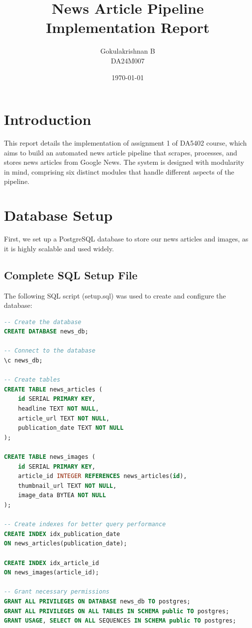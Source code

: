 \documentclass{article}
\title{News Article Pipeline Implementation Report}
\author{Gokulakrishnan B \\ DA24M007}
\date{\today}
\begin{document}
\maketitle

\section{Introduction}
This report details the implementation of assignment 1 of DA5402 course, which aims to build an automated news article pipeline that scrapes, processes, and stores news articles from Google News. The system is designed with modularity in mind, comprising six distinct modules that handle different aspects of the pipeline.

\section{Database Setup}
First, we set up a PostgreSQL database to store our news articles and images, as it is highly scalable and used widely.

\subsection{Complete SQL Setup File}
The following SQL script (setup.sql) was used to create and configure the database:

\begin{lstlisting}[language=SQL]
-- Create the database
CREATE DATABASE news_db;

-- Connect to the database
\c news_db;

-- Create tables
CREATE TABLE news_articles (
    id SERIAL PRIMARY KEY,
    headline TEXT NOT NULL,
    article_url TEXT NOT NULL,
    publication_date TEXT NOT NULL
);

CREATE TABLE news_images (
    id SERIAL PRIMARY KEY,
    article_id INTEGER REFERENCES news_articles(id),
    thumbnail_url TEXT NOT NULL,
    image_data BYTEA NOT NULL
);

-- Create indexes for better query performance
CREATE INDEX idx_publication_date 
ON news_articles(publication_date);

CREATE INDEX idx_article_id 
ON news_images(article_id);

-- Grant necessary permissions
GRANT ALL PRIVILEGES ON DATABASE news_db TO postgres;
GRANT ALL PRIVILEGES ON ALL TABLES IN SCHEMA public TO postgres;
GRANT USAGE, SELECT ON ALL SEQUENCES IN SCHEMA public TO postgres;
\end{lstlisting}
\end{document}
